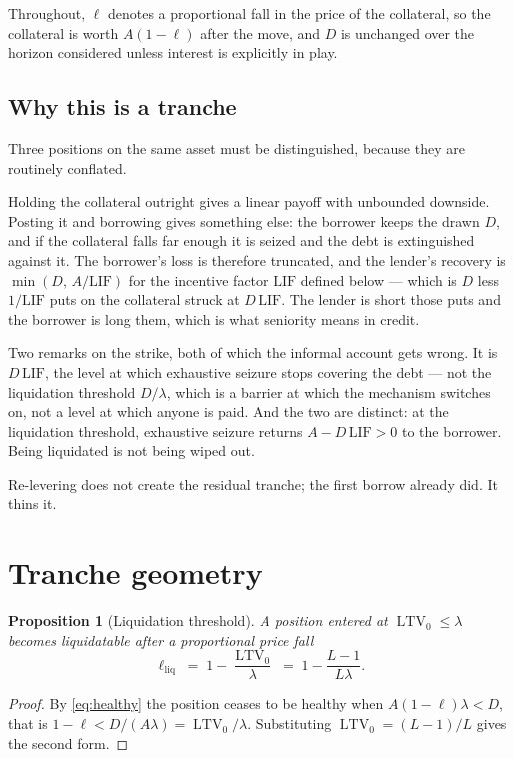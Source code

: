 \documentclass[11pt,a4paper]{article}
\theoremstyle{plain}
\newtheorem{proposition}{Proposition}
\theoremstyle{definition}
\theoremstyle{remark}
\newcommand{\LIF}{\mathrm{LIF}}
\DeclareMathOperator{\ltv}{LTV}
\begin{document}
Throughout, $\ell$ denotes a proportional fall in the price of the collateral, so the collateral
is worth $A(1-\ell)$ after the move, and $D$ is unchanged over the horizon considered unless
interest is explicitly in play.

\subsection{Why this is a tranche}

Three positions on the same asset must be distinguished, because they are routinely conflated.

Holding the collateral outright gives a linear payoff with unbounded downside. Posting it and
borrowing gives something else: the borrower keeps the drawn $D$, and if the collateral falls
far enough it is seized and the debt is extinguished against it. The borrower's loss is
therefore truncated, and the lender's recovery is $\min(D,\,A/\LIF)$ for the incentive factor
$\LIF$ defined below --- which is $D$ less $1/\LIF$ puts on the collateral struck at $D\,\LIF$.
The lender is short those puts and the borrower is long them, which is what seniority means in
credit.

Two remarks on the strike, both of which the informal account gets wrong. It is $D\,\LIF$, the
level at which exhaustive seizure stops covering the debt --- not the liquidation threshold
$D/\lambda$, which is a barrier at which the mechanism switches on, not a level at which anyone
is paid. And the two are distinct: at the liquidation threshold, exhaustive seizure returns
$A - D\,\LIF > 0$ to the borrower. Being liquidated is not being wiped out.

Re-levering does not create the residual tranche; the first borrow already did. It thins it.

\section{Tranche geometry}

\begin{proposition}[Liquidation threshold]\label{prop:liq}
A position entered at $\ltv_0 \leq \lambda$ becomes liquidatable after a proportional price fall
\[
  \ell_{\mathrm{liq}} \;=\; 1-\frac{\ltv_0}{\lambda} \;=\; 1-\frac{L-1}{L\lambda}.
\]
\end{proposition}

\begin{proof}
By \eqref{eq:healthy} the position ceases to be healthy when $A(1-\ell)\lambda < D$, that is
$1-\ell < D/(A\lambda) = \ltv_0/\lambda$. Substituting $\ltv_0=(L-1)/L$ gives the second form.
\end{proof}
\end{document}
